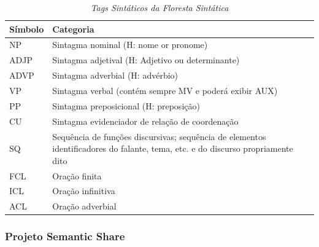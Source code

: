 \begin{table}
   \centering
   \small
   \caption{\it Tags Sintáticos da Floresta Sintática}
   

    \begin{tabular}{ | p{3cm} | p{10cm} | }
      \hline
        \textbf{Símbolo} & \textbf{Categoria}\\
        \hline
        \hline

            NP&Sintagma nominal
            (H: nome or pronome)\\
            \hline

            ADJP&Sintagma adjetival
            (H: Adjetivo ou determinante)\\
            \hline

            ADVP&Sintagma adverbial
            (H: advérbio)\\
            \hline

            VP&Sintagma verbal
            (contém sempre MV e poderá exibir AUX)\\
            \hline

            PP&Sintagma preposicional
            (H: preposição)\\
            \hline

            CU&Sintagma evidenciador de relação de coordenação\\
            \hline

            SQ&Sequência de funções discursivas; sequência de elementos identificadores do falante, tema, etc. e do discurso propriamente dito\\


            \hline

            FCL& Oração finita\\

            \hline

            ICL&Oração infinitiva\\

            \hline

            ACL&Oração adverbial\\

            \hline


   \end{tabular}
   \label{tbl:floresta_sintatica_cats}
\end{table}

\subsubsection{Projeto Semantic Share}
\label{sub:sub_semantic_corpus}

